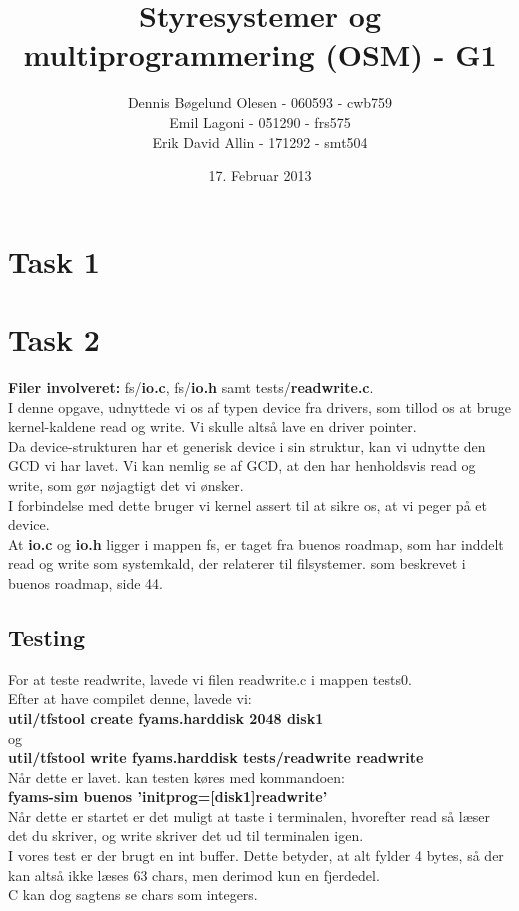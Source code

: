 \documentclass[a4paper,12pt]{article}
\title{Styresystemer og multiprogrammering (OSM) - G1}
\author{Dennis Bøgelund Olesen - 060593 - cwb759 \\ Emil Lagoni - 051290 - frs575 \\ Erik David Allin - 171292 - smt504}
\date{17. Februar 2013}
\begin{document}
\maketitle %
\thispagestyle{empty}
\setcounter{page}{0}
\newpage



\section*{Task 1}


\section*{Task 2}
\textbf{Filer involveret:} fs/\textbf{io.c}, fs/\textbf{io.h} samt tests/\textbf{readwrite.c}.
\\[5px]
I denne opgave, udnyttede vi os af typen device fra drivers, som tillod os at bruge kernel-kaldene read og write. Vi skulle altså lave en driver pointer. 
\\
Da device-strukturen har et generisk device i sin struktur, kan vi udnytte den GCD vi har lavet. Vi kan nemlig se af GCD, at den har henholdsvis read og write, som gør nøjagtigt det vi ønsker. 
\\
I forbindelse med dette bruger vi kernel assert til at sikre os, at vi peger på et device.
\\
At \textbf{io.c} og \textbf{io.h} ligger i mappen fs, er taget fra buenos roadmap, som har inddelt read og write som systemkald, der relaterer til filsystemer. som beskrevet i buenos roadmap, side 44. 
\\
\subsection*{Testing}
For at teste readwrite, lavede vi filen readwrite.c i mappen tests0.
\\
Efter at have compilet denne, lavede vi:
\\
\textbf{util/tfstool create fyams.harddisk 2048 disk1}
\\
og
\\
\textbf{util/tfstool write fyams.harddisk tests/readwrite readwrite}
\\[5px]
Når dette er lavet. kan testen køres med kommandoen: 
\\
\textbf{fyams-sim buenos 'initprog=[disk1]readwrite'}
\\
Når dette er startet er det muligt at taste i terminalen, hvorefter read så læser det du skriver, og write skriver det ud til terminalen igen. 
\\
I vores test er der brugt en int buffer. Dette betyder, at alt fylder 4 bytes, så der kan altså ikke læses 63 chars, men derimod kun en fjerdedel. 
\\
C kan dog sagtens se chars som integers.
\end{document}
